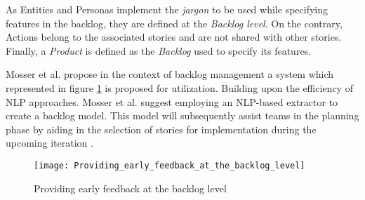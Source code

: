 As Entities and Personas implement the \emph{jargon} to be used while specifying features in the backlog, they are deﬁned at the \emph{Backlog level}. On the contrary, Actions belong to the associated stories and are not shared with other stories. Finally, a \emph{Product} is deﬁned as the \emph{Backlog} used to specify its features.

Mosser et al. propose in the context of backlog management a system which represented in figure \ref{fig:early_feedback} is proposed for utilization. Building upon the efficiency of NLP approaches. Mosser et al. suggest employing an NLP-based extractor to create a backlog model. This model will subsequently assist teams in the planning phase by aiding in the selection of stories for implementation during the upcoming iteration \cite{mosser2022modelling}.
\begin{figure}
\center
\texttt{[image: Providing\_early\_feedback\_at\_the\_backlog\_level]}
\caption{Providing early feedback at the backlog level \cite{mosser2022modelling}}\label{fig:early_feedback}
\end{figure}

